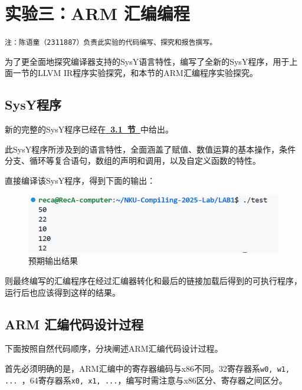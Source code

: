 \documentclass[UTF8,a4paper,10pt]{ctexart}
\begin{document}
\vspace{3em}

\section{实验三：ARM 汇编编程}
\begin{center}
	\texttt{注：陈语童（2311887）负责此实验的代码编写、探究和报告撰写。}
\end{center}

\vspace{1em}

为了更全面地探究编译器支持的SysY语言特性，编写了全新的SysY程序，用于上面一节的LLVM IR程序实验探究，和本节的ARM汇编程序实验探究。

\subsection{SysY程序}
新的完整的SysY程序已经在\hyperref[this-subsection]{\textbf{\textcolor{deepblue}{~3.1~节~}}}中给出。

此SysY程序所涉及到的语言特性，全面涵盖了赋值、数值运算的基本操作，条件分支、循环等复合语句，数组的声明和调用，以及自定义函数的特性。

直接编译该SysY程序，得到下面的输出：
\begin{figure} [H] \label{expectation}
    \centering
    \includegraphics[width=0.7\linewidth]{expected_res.png}
    \caption{预期输出结果}
    \label{fig:placeholder}
\end{figure}

则最终编写的汇编程序在经过汇编器转化和最后的链接加载后得到的可执行程序，运行后也应该得到这样的结果。

\vspace{1em}

\subsection{ARM 汇编代码设计过程}
下面按照自然代码顺序，分块阐述ARM汇编代码设计过程。

\vspace{1em}

首先必须明确的是，ARM汇编中的寄存器编码与x86不同。32寄存器系\texttt{w0, w1, ... }，64寄存器系\texttt{x0, x1, ...}，编写时需注意与x86区分、寄存器之间区分。
\end{document}
